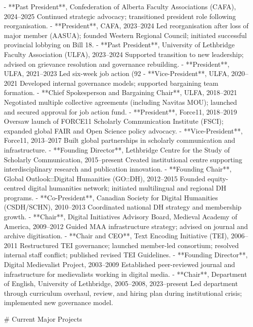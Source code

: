 - **Past President**, Confederation of Alberta Faculty Associations (CAFA), 2024–2025
  Continued strategic advocacy; transitioned president role following reorganisation.
- **President**, CAFA, 2023–2024
  Led reorganisation after loss of major member (AASUA); founded Western Regional Council; initiated successful provincial lobbying on Bill 18.
- **Past President**, University of Lethbridge Faculty Association (ULFA), 2023–2024
  Supported transition to new leadership; advised on grievance resolution and governance rebuilding.
- **President**, ULFA, 2021–2023
  Led six-week job action (92%
- **Vice-President**, ULFA, 2020–2021
  Developed internal governance models; supported bargaining team formation.
- **Chief Spokesperson and Bargaining Chair**, ULFA, 2018–2021
  Negotiated multiple collective agreements (including Navitas MOU); launched and secured approval for job action fund.
- **President**, Force11, 2018–2019
  Oversaw launch of FORCE11 Scholarly Communication Institute (FSCI); expanded global FAIR and Open Science policy advocacy.
- **Vice-President**, Force11, 2013–2017
  Built global partnerships in scholarly communication and infrastructure.
- **Founding Director**, Lethbridge Centre for the Study of Scholarly Communication, 2015–present
  Created institutional centre supporting interdisciplinary research and publication innovation.
- **Founding Chair**, Global Outlook::Digital Humanities (GO::DH), 2012–2015
  Founded equity-centred digital humanities network; initiated multilingual and regional DH programs.
- **Co-President**, Canadian Society for Digital Humanities (CSDH/\allowbreak{}SCHN), 2010–2013
  Coordinated national DH strategy and membership growth.
- **Chair**, Digital Initiatives Advisory Board, Medieval Academy of America, 2009–2012
  Guided MAA infrastructure strategy; advised on journal and archive digitisation.
- **Chair and CEO**, Text Encoding Initiative (TEI), 2006–2011
  Restructured TEI governance; launched member-led consortium; resolved internal staff conflict; published revised TEI Guidelines.
- **Founding Director**, Digital Medievalist Project, 2003–2009
  Established peer-reviewed journal and infrastructure for medievalists working in digital media.
- **Chair**, Department of English, University of Lethbridge, 2005–2008, 2023–present
  Led department through curriculum overhaul, review, and hiring plan during institutional crisis; implemented new governance model.

\sectionbreak{}
# Current Major Projects

